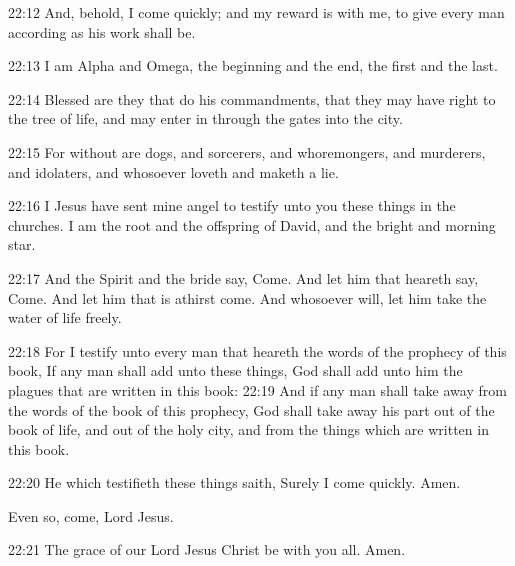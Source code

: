 22:12 And, behold, I come quickly; and my reward is with me, to give every man according as his work shall be.

22:13 I am Alpha and Omega, the beginning and the end, the first and the last.

22:14 Blessed are they that do his commandments, that they may have right to the tree of life, and may enter in through the gates into the city.

22:15 For without are dogs, and sorcerers, and whoremongers, and murderers, and idolaters, and whosoever loveth and maketh a lie.

22:16 I Jesus have sent mine angel to testify unto you these things in the churches. I am the root and the offspring of David, and the bright and morning star.

22:17 And the Spirit and the bride say, Come. And let him that heareth say, Come. And let him that is athirst come. And whosoever will, let him take the water of life freely.

22:18 For I testify unto every man that heareth the words of the prophecy of this book, If any man shall add unto these things, God shall add unto him the plagues that are written in this book: 22:19 And if any man shall take away from the words of the book of this prophecy, God shall take away his part out of the book of life, and out of the holy city, and from the things which are written in this book.

22:20 He which testifieth these things saith, Surely I come quickly.  Amen.

Even so, come, Lord Jesus.

22:21 The grace of our Lord Jesus Christ be with you all. Amen.


